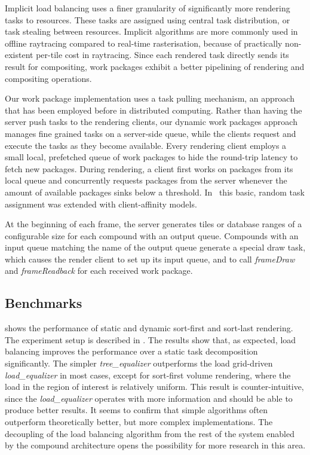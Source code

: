 Implicit load balancing uses a finer granularity of significantly more rendering tasks
to resources. These tasks are assigned using central task distribution, or
 task stealing between resources. Implicit algorithms are more
commonly used in offline raytracing compared to real-time rasterisation,
 because of practically non-existent per-tile cost in raytracing.
Since each rendered task directly sends its result for
compositing, work packages exhibit a better pipelining of rendering and
compositing operations.

Our work package implementation uses a task pulling mechanism, an approach that
has been employed before in distributed computing. Rather than having the
server push tasks to the rendering clients, our dynamic work packages approach
manages fine grained tasks on a server-side queue, while the clients
request and execute the tasks as they become available. Every rendering client
employs a small local, prefetched queue of work packages to hide the round-trip
latency to fetch new packages. During rendering, a client first works on
packages from its local queue and concurrently requests packages from the
server whenever the amount of available packages sinks below a threshold.
In~\cite{SPEP:16} this basic, random task assignment was extended with
client-affinity models.

At the beginning of each frame, the server generates tiles or database ranges
of a configurable size for each compound with an output queue. Compounds with
an input queue matching the name of the output queue generate a special draw
task, which causes the render client to set up its input queue, and to call
{\em frameDraw} and {\em frameReadback} for each received work package.


\subsection{Benchmarks}

 shows the performance of static and dynamic sort-first
and sort-last rendering. The experiment setup is described in \cite{ESP:18}.
The results show that, as expected, load balancing improves the performance
over a static task decomposition significantly. The simpler
{\em tree\_equalizer} outperforms the load grid-driven
{\em load\_equalizer} in most cases, except for sort-first volume rendering,
where the load in the region of interest is relatively uniform. This result is
counter-intuitive, since the {\em load\_equalizer} operates with more
information and should be able to produce better results. It seems to confirm
that simple algorithms often outperform theoretically better, but more complex
implementations. The decoupling of the load balancing algorithm from the rest
of the system enabled by the compound architecture opens the possibility for
more research in this area.

